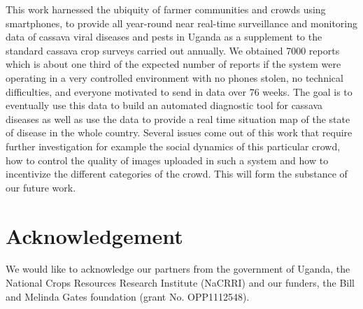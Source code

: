 \documentclass[letterpaper]{article} %
\begin{document}
This work harnessed the ubiquity of farmer communities and crowds using smartphones, to provide all year-round near real-time surveillance and monitoring data of cassava viral diseases and pests in Uganda as a supplement to the standard cassava crop surveys carried out annually. We obtained 7000 reports which is about one third of the expected number of reports if the system were operating in a very controlled environment with no phones stolen, no technical difficulties, and everyone motivated to send in data over 76 weeks. The goal is to eventually use this data to build an automated diagnostic tool for cassava diseases as well as use the data to provide a real time situation map of the state of disease in the whole country. Several issues come out of this work that require further investigation for example the social dynamics of this particular crowd, how to control the quality of images uploaded in such a system and how to incentivize the different categories of the crowd. This will form the substance of our future work.


\section{Acknowledgement}
We would like to acknowledge our partners from the government of Uganda, the National Crops Resources Research Institute (NaCRRI) and our funders, the Bill and Melinda Gates foundation (grant No. OPP1112548).
\end{document}
